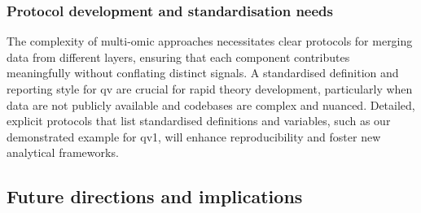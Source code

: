 \subsubsection{Protocol development and standardisation needs} 
The complexity of multi-omic approaches necessitates clear protocols for merging data from different layers, ensuring that each component contributes meaningfully without conflating distinct signals. A standardised definition and reporting style for \ac{qv} are crucial for rapid theory development, particularly when data are not publicly available and codebases are complex and nuanced. Detailed, explicit protocols that list standardised definitions and variables, such as our demonstrated example for \ac{qv}1, will enhance reproducibility and foster new analytical frameworks.


\subsection{Future directions and implications} 
